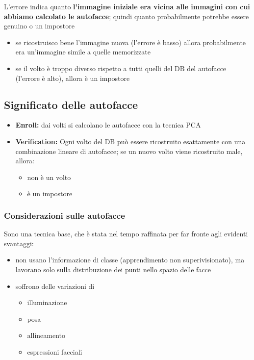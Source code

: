 \documentclass{report}
\begin{document}
\noindent L'errore indica quanto \textbf{l'immagine iniziale era vicina alle immagini con 
cui abbiamo calcolato le autofacce}; quindi quanto probabilmente potrebbe 
essere genuino o un impostore
\begin{itemize}
    \item se ricostruisco bene l'immagine nuova (l'errore è basso) allora probabilmente era 
    un'immagine simile a quelle memorizzate 
    \item se il volto è troppo diverso rispetto a tutti quelli del DB del autofacce (l'errore è alto), allora è un impostore
\end{itemize}

\newpage
\subsection{Significato delle autofacce}
\begin{itemize}
    \item \textbf{Enroll:} dai volti si calcolano le autofacce con la tecnica PCA
    \item \textbf{Verification:} Ogni volto del DB può essere ricostruito esattamente con una 
    combinazione lineare di autofacce; se un nuovo volto viene ricostruito male, allora:
    \begin{itemize}
        \item non è un volto 
        \item è un impostore
    \end{itemize}
\end{itemize}

\subsubsection{Considerazioni sulle autofacce}
Sono una tecnica base, che è stata nel tempo raffinata per far fronte 
agli evidenti svantaggi:
\begin{itemize}
    \item non usano l'informazione di classe (apprendimento non superivisionato), ma 
    lavorano solo sulla distribuzione dei punti nello spazio delle facce
    \item soffrono delle variazioni di 
    \begin{itemize}
        \item illuminazione
        \item posa 
        \item allineamento 
        \item espressioni facciali
    \end{itemize}
\end{itemize}
\end{document}
